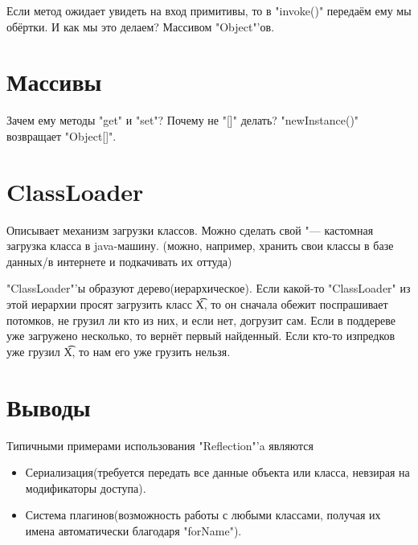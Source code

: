 Если метод ожидает увидеть на вход примитивы, то в \java"invoke()" передаём ему мы обёртки. 
И как мы это делаем? Массивом \java"Object"'ов.


\section{Массивы}
Зачем ему методы \java"get" и \java"set"? Почему не \java"[]" делать?
\java"newInstance()" возвращает \java"Object[]".

\section{ClassLoader}
Описывает механизм загрузки классов.
Можно сделать свой "--- кастомная загрузка класса в java-машину.
(можно, например, хранить свои классы в базе данных/в интернете и подкачивать их оттуда)

\java"ClassLoader"'ы образуют дерево(иерархическое). Если какой-то \java"ClassLoader" из этой иерархии просят загрузить класс \t{X}, 
то он сначала обежит поспрашивает потомков, не грузил ли кто из них,
и если нет, догрузит сам. Если в поддереве уже загружено несколько, то вернёт первый найденный. Если кто-то изпредков уже грузил \t{X}, 
то нам его уже грузить нельзя.

\section{Выводы}
Типичными примерами использования \java"Reflection"'a являются 
\begin{itemize}
	\item
		Сериализация(требуется передать все данные объекта или класса, невзирая на модификаторы доступа).
	\item
		Система плагинов(возможность работы с любыми классами, получая их имена автоматически благодаря \java"forName").
\end{itemize}

